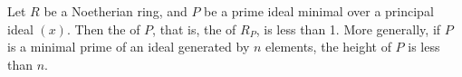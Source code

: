 \documentclass[12pt]{article}
\begin{document}

Let $R$ be a Noetherian ring, and $P$ be a prime ideal minimal over a principal ideal $(x)$.
Then the  of $P$, that is, the  of $R_P$, is less than 1.
More generally, if $P$ is a minimal prime of an ideal generated by $n$ elements, the height of $P$ is less than $n$.
\end{document}
